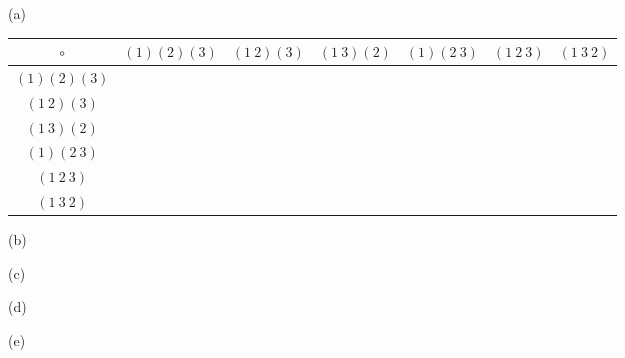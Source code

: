 
\newpage
(a)
\begin{longtable}{|c||c|c|c|c|c|c|}
  \hline
$\circ$       & $(1)(2)(3)$ & $(1 \ 2)(3)$ & $(1 \ 3)(2)$ & $(1)(2 \ 3)$ & $(1 \ 2 \ 3)$ & $(1 \ 3 \ 2)$ \\ \hline \hline
$(1)(2)(3)$   &             &              &              &              &               &               \\ \hline 
$(1 \ 2)(3)$  &             &              &              &              &               &               \\ \hline
$(1 \ 3)(2)$  &             &              &              &              &               &               \\ \hline
$(1)(2 \ 3)$  &             &              &              &              &               &               \\ \hline
$(1 \ 2 \ 3)$ &             &              &              &              &               &               \\ \hline
$(1 \ 3 \ 2)$ &             &              &              &              &               &               \\ \hline
\end{longtable}

(b)

(c)

(d)

(e)
